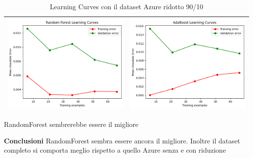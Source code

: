 \begin{table}[H]
\begin{tabularx}{\textwidth}{|X|X|}
        \includegraphics[width=\linewidth, trim=0 0 0 0]{images/RandomForest_lc90_ridottoAzure.png} &
        \includegraphics[width=\linewidth, trim=0 0 0 0]{images/AdaBoost_lc90_ridottoAzure.png} \\
        \hline
    \end{tabularx}
    \caption{Learning Curves con il dataset Azure ridotto 90/10}
    \label{tab:emissions_info}
\end{table}

\noindent RandomForest sembrerebbe essere il migliore

\noindent\textbf{Conclusioni}
RandomForest sembra essere ancora il migliore.
Inoltre il dataset completo si comporta meglio rispetto a quello Azure senza e con riduzione